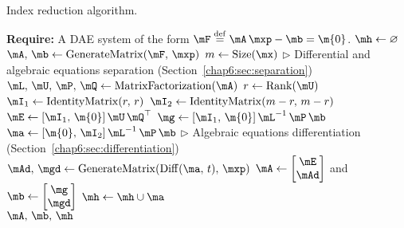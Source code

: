 \begin{algorithm}
  \caption{Index reduction algorithm.}
  \label{chap6:alg:index_reduction}
  \begin{algorithmic}[1]
    \State \textbf{Require:} A \ac{DAE} system of the form $\mF \overset{\mathrm{def}}{=} \mA \, \mxp - \mb = \m{0}$.
     
      \State $\mh \gets \varnothing$ 
      \State $\mA, \, \mb \gets \mathrm{GenerateMatrix}(\mF, \, \mxp)$ 
      \State $m \gets \mathrm{Size}(\mx)$
        \State $\displaystyle\triangleright$ Differential and algebraic equations separation (Section~\ref{chap6:sec:separation})
        \State $\mL, \, \mU, \, \mP, \, \mQ \gets \mathrm{MatrixFactorization}(\mA)$ 
        \State $r \gets \mathrm{Rank}(\mU)$ 
        \State $\mI_1 \gets \mathrm{IdentityMatrix}(r, \, r)$ 
        \State $\mI_2 \gets \mathrm{IdentityMatrix}(m-r, \, m-r)$ 
        \State $\mE \gets [\mI_1, \, \m{0}] \, \mU \, \mQ^\top$ 
        \State $\mg \gets [\mI_1, \, \m{0}] \, \mL^{-1} \, \mP \, \mb$ 
        \State $\ma \gets [\m{0}, \, \mI_2] \, \mL^{-1} \, \mP \, \mb$ 
        \State
        \State $\displaystyle\triangleright$ Algebraic equations differentiation (Section~\ref{chap6:sec:differentiation})
        \State $\mAd, \, \mgd \gets \mathrm{GenerateMatrix}(\mathrm{Diff}(\ma, \, t), \, \mxp)$ 
        \State $\mA \gets \begin{bmatrix} \mE \\ \mAd \end{bmatrix}$ \quad and \quad $\mb \gets \begin{bmatrix}\mg \\ \mgd \end{bmatrix}$
        \State $\mh \gets \mh \cup \ma$ 
      \EndWhile \\
      \Return $\mA, \, \mb, \, \mh$ 
    \EndProcedure
  \end{algorithmic}
\end{algorithm}

